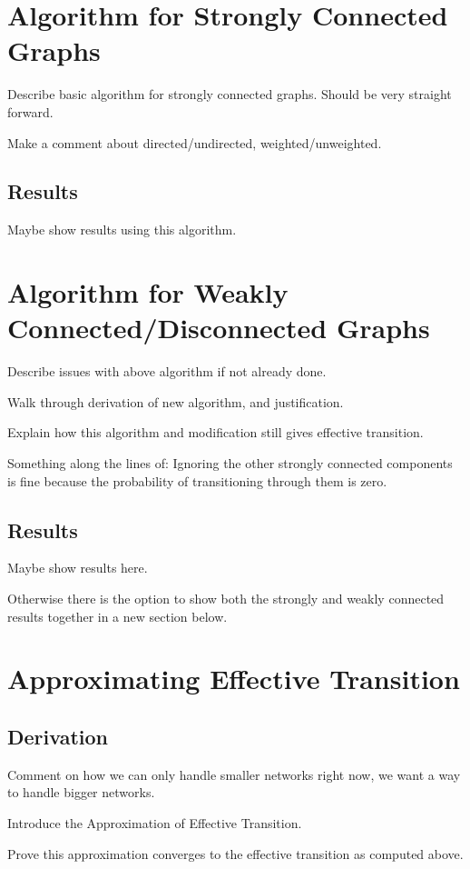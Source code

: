 \documentclass{imanum}
\begin{document}
\section{Algorithm for Strongly Connected Graphs}
\label{sec;strong}

Describe basic algorithm for strongly connected graphs. Should be very straight forward. 

Make a comment about directed/undirected, weighted/unweighted.

\subsection{Results}
Maybe show results using this algorithm. 

\section{Algorithm for Weakly Connected/Disconnected Graphs}
Describe issues with above algorithm if not already done.

Walk through derivation of new algorithm, and justification.

Explain how this algorithm and modification still gives effective transition.

Something along the lines of: Ignoring the other strongly connected components is fine because the probability of transitioning through them is zero.

\subsection{Results}
Maybe show results here.

Otherwise there is the option to show both the strongly and weakly connected results together in a new section below. 

\section{Approximating Effective Transition}

\subsection{Derivation}
Comment on how we can only handle smaller networks right now, we want a way to handle bigger networks.

Introduce the Approximation of Effective Transition.

Prove this approximation converges to the effective transition as computed above. 
\end{document}
